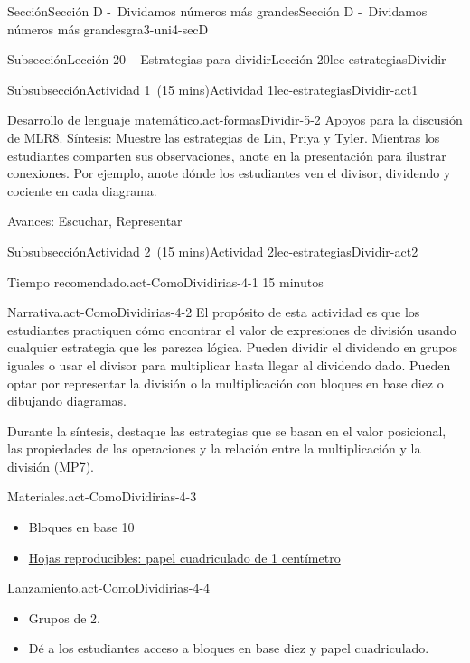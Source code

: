 \documentclass[oneside,10pt,]{article}
\begin{document}
\begin{sectionptx}{Sección}{Sección D -~Dividamos números más grandes}{}{Sección D -~Dividamos números más grandes}{}{}{gra3-uni4-secD}
\begin{subsectionptx}{Subsección}{Lección 20 -~Estrategias para dividir}{}{Lección 20}{}{}{lec-estrategiasDividir}
\begin{subsubsectionptx}{Subsubsección}{Actividad 1~(15 mins)}{}{Actividad 1}{}{}{lec-estrategiasDividir-act1}
\begin{paragraphs}{Desarrollo de lenguaje matemático.}{act-formasDividir-5-2}
Apoyos para la discusión de MLR8. Síntesis: Muestre las estrategias de Lin, Priya y Tyler. Mientras los estudiantes comparten sus observaciones, anote en la presentación para ilustrar conexiones. Por ejemplo, anote dónde los estudiantes ven el divisor, dividendo y cociente en cada diagrama.%
\par
Avances: Escuchar, Representar%
\end{paragraphs}%
\end{subsubsectionptx}
%
%
\typeout{************************************************}
\typeout{************************************************}
%
\begin{subsubsectionptx}{Subsubsección}{Actividad 2~(15 mins)}{}{Actividad 2}{}{}{lec-estrategiasDividir-act2}
\par
\begin{paragraphs}{Tiempo recomendado.}{act-ComoDividirias-4-1}%
15 minutos%
\end{paragraphs}%
\begin{paragraphs}{Narrativa.}{act-ComoDividirias-4-2}%
El propósito de esta actividad es que los estudiantes practiquen cómo encontrar el valor de expresiones de división usando cualquier estrategia que les parezca lógica. Pueden dividir el dividendo en grupos iguales o usar el divisor para multiplicar hasta llegar al dividendo dado. Pueden optar por representar la división o la multiplicación con bloques en base diez o dibujando diagramas.%
\par
Durante la síntesis, destaque las estrategias que se basan en el valor posicional, las propiedades de las operaciones y la relación entre la multiplicación y la división (MP7).%
\end{paragraphs}%
\begin{paragraphs}{Materiales.}{act-ComoDividirias-4-3}%
%
\begin{itemize}[label=\textbullet]
\item{}Bloques en base 10%
\item{}\hyperref[blm-papelCuadriculadoCentimetro]{Hojas reproducibles: papel cuadriculado de 1 centímetro}%
\end{itemize}
\end{paragraphs}%
\begin{paragraphs}{Lanzamiento.}{act-ComoDividirias-4-4}%
%
\begin{itemize}[label=\textbullet]
\item{}Grupos de 2.%
\item{}Dé a los estudiantes acceso a bloques en base diez y papel cuadriculado.%

\end{itemize}
\end{paragraphs}
\end{subsubsectionptx}
\end{subsectionptx}
\end{sectionptx}
\end{document}
